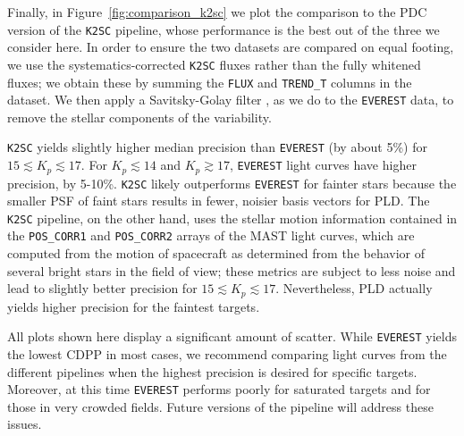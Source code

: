 \documentclass[]{emulateapj}
\begin{document}
Finally, in Figure~\ref{fig:comparison_k2sc} we plot the comparison to the PDC version
of the \texttt{K2SC}
pipeline, whose performance is the best out of the three we consider here. In order to 
ensure the two datasets are compared on equal footing, we use the systematics-corrected
\texttt{K2SC} fluxes rather than the fully whitened fluxes; we obtain these by
summing the \texttt{FLUX} and \texttt{TREND\_T} columns in the dataset. We then apply
a Savitsky-Golay filter \citep{SG64}, as we do to the \texttt{EVEREST} data, to remove the stellar 
components of the variability.

\texttt{K2SC} yields slightly higher median precision than \texttt{EVEREST} (by about 5\%) for 
$15 \lesssim K_p \lesssim 17$. For $K_p \lesssim 14$ and $K_p \gtrsim 17$, \texttt{EVEREST}
light curves have higher precision, by 5-10\%. \texttt{K2SC} likely outperforms
\texttt{EVEREST} for fainter stars because the smaller PSF of faint
stars results in fewer, noisier basis vectors for PLD. The \texttt{K2SC} pipeline, on 
the other hand, uses the stellar motion information contained in the \texttt{POS\_CORR1}
and \texttt{POS\_CORR2} arrays of the MAST light curves, which are computed from the
motion of spacecraft as determined from the behavior of several bright stars in the field
of view; these metrics are subject to less noise and lead to slightly better precision
for $15 \lesssim K_p \lesssim 17$. Nevertheless, PLD actually yields higher precision 
for the faintest targets.

All plots shown here display a significant amount of scatter. While \texttt{EVEREST}
yields the lowest CDPP in most cases, we recommend comparing light curves from
the different pipelines when the highest precision is desired for specific targets.
Moreover, at this time \texttt{EVEREST} performs poorly for saturated
targets and for those in very crowded fields. Future versions of the pipeline will address
these issues.
\end{document}
